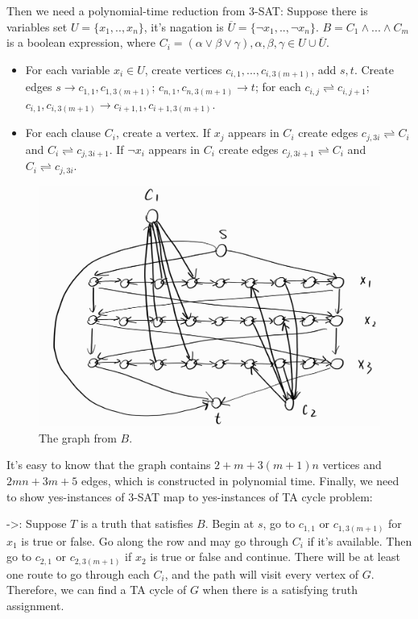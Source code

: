 {Then we need a polynomial-time reduction from 3-SAT: Suppose there is variables set $U = \{x_1,..,x_n\}$, it's nagation is $\overline{U} = \{\neg x_1,..,\neg x_n\}$. $B = C_1\wedge...\wedge C_m$ is a boolean expression, where $C_i = (\alpha \vee \beta \vee \gamma),\alpha,\beta,\gamma \in U \cup \overline{U}$. 
\begin{itemize}
	\item For each variable $x_i\in U$, create vertices $c_{i,1},...,c_{i,3(m+1)}$, add $s,t$. Create edges $s\to c_{1,1},c_{1,3(m+1)}$; $c_{n,1},c_{n,3(m+1)}\to t$; for each $c_{i,j}\rightleftharpoons c_{i,j+1}$; $c_{i,1},c_{i,3(m+1)}\to c_{i+1,1},c_{i+1,3(m+1)}$.
	\item For each clause $C_i$, create a vertex. If $x_j$ appears in $C_i$ create edges $c_{j,3i}\rightleftharpoons C_i$ and $C_i \rightleftharpoons c_{j,3i+1}$. If $\neg x_i$ appears in $C_i$ create edges $c_{j,3i+1}\rightleftharpoons C_i$ and $C_i \rightleftharpoons c_{j,3i}$. 
\end{itemize}
\begin{figure}[ht]
	\centering
	\includegraphics[scale=0.2]{q5.jpg}
	\caption{The graph from $B$.}
\end{figure}

It's easy to know that the graph contains $2+m+3(m+1)n$ vertices and $2mn+3m+5$ edges, which is constructed in polynomial time. Finally, we need to show yes-instances of 3-SAT map to yes-instances of TA cycle problem:

->: Suppose $T$ is a truth that satisfies $B$. Begin at $s$, go to $c_{1,1}$ or $c_{1,3(m+1)}$ for $x_1$ is true or false. Go along the row and may go through $C_i$ if it's available. Then go to $c_{2,1}$ or $c_{2,3(m+1)}$ if $x_2$ is true or false and continue. There will be at least one route to go through each $C_i$, and the path will visit every vertex of $G$. Therefore, we can find a TA cycle of $G$ when there is a satisfying truth assignment.

}
